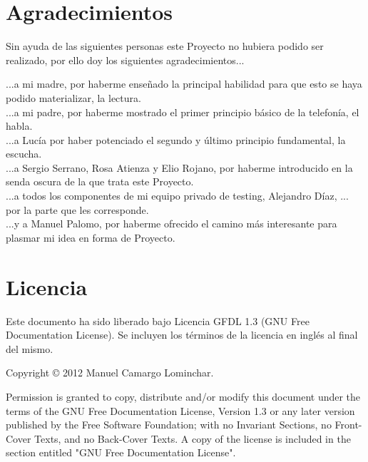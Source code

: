 
\section*{Agradecimientos}

Sin ayuda de las siguientes personas este Proyecto no hubiera podido ser realizado, por ello doy los siguientes agradecimientos...

...a mi madre, por haberme enseñado la principal habilidad para que esto se haya podido materializar, la lectura.\\
...a mi padre, por haberme mostrado el primer principio básico de la telefonía, el habla.\\
...a Lucía por haber potenciado el segundo y último principio fundamental, la escucha.\\
...a Sergio Serrano, Rosa Atienza y Elio Rojano, por haberme introducido en la senda oscura de la que trata este Proyecto.\\
...a todos los componentes de mi equipo privado de testing, Alejandro Díaz, ... por la parte que les corresponde.\\
...y a Manuel Palomo, por haberme ofrecido el camino más interesante para plasmar mi idea en forma de Proyecto.\\

\cleardoublepage

\section*{Licencia}

Este documento ha sido liberado bajo Licencia GFDL 1.3 (GNU Free
Documentation License). Se incluyen los términos de la licencia en
inglés al final del mismo.

Copyright © 2012 Manuel Camargo Lominchar.

Permission is granted to copy, distribute and/or modify this document under the
terms of the GNU Free Documentation License, Version 1.3 or any later version
published by the Free Software Foundation; with no Invariant Sections, no
Front-Cover Texts, and no Back-Cover Texts. A copy of the license is included in
the section entitled "GNU Free Documentation License".

